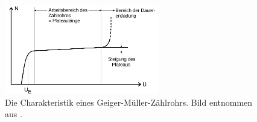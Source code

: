 \begin{figure}
    \centering
    \includegraphics[width=0.6\textwidth]{content/data/charak.png}
    \caption{Die Charakteristik eines Geiger-Müller-Zählrohrs. Bild entnommen aus \cite{anleitung}.}
    \label{fig:schemcharak}
\end{figure}


